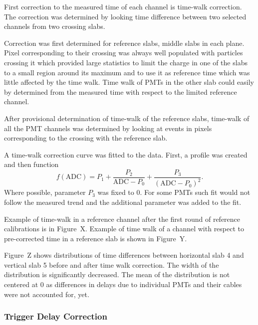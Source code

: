 First correction to the measured time of each channel is time-walk
correction. The correction was determined by looking time difference
between two selected channels from two crossing slabs.

Correction was first determined for reference slabs, middle slabs in
each plane. Pixel corresponding to their crossing was always well
populated with particles crossing it which provided large statistics
to limit the charge in one of the slabs to a small region around its
maximum and to use it as reference time which was little affected by
the time walk. Time walk of PMTs in the other slab could easily by
determined from the measured time with respect to the limited
reference channel.

After provisional determination of time-walk of the reference slabs,
time-walk of all the PMT channels was determined by looking at events
in pixels corresponding to the crossing with the reference slab.

A time-walk correction curve was fitted to the data. First, a profile
was created and then function
%
\begin{equation}
  \newcommand{\ADC}{\text{ADC}}
  \label{eq:twf}
  f(\ADC) = P_1 + \frac{P_2}{\ADC - P_0} + \frac{P_3}{\left(\ADC - P_0\right)^2}.
\end{equation}
%
Where possible, parameter $P_3$ was fixed to 0. For some PMTs such fit
would not follow the measured trend and the additional parameter was
added to the fit.


Example of time-walk in a reference channel after the first round of
reference calibrations is in Figure~X. Example of time walk of a
channel with respect to pre-corrected time in a reference slab is
shown in Figure~Y.

Figure~Z shows distributions of time differences between horizontal
slab 4 and vertical slab 5 before and after time walk correction. The
width of the distribution is significantly decreased. The mean of the
distribution is not centered at 0 as differences in delays \Tzero{} due to
individual PMTs and their cables were not accounted for, yet.

\subsubsection{Trigger Delay Correction}
\newcommand{\Tdelay}[2]{\ensuremath{T_{\text{tr}}^{#1,#2}}}


